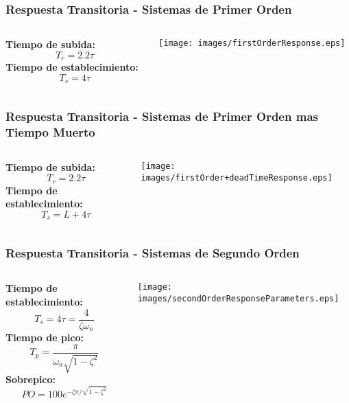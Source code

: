 \documentclass[aspectratio=169,handout]{beamer}
\theoremstyle{definition}
\theoremstyle{plain}
\theoremstyle{remark}
\begin{document}
\begin{frame}\frametitle{Respuesta Transitoria - Sistemas de Primer Orden}
\vspace*{3mm}
\begin{columns}
 \begin{column}{0.3\textwidth}
 \textbf{Tiempo de subida:}
 \begin{equation*}
   T_r = 2.2 \tau
 \end{equation*}
 \textbf{Tiempo de establecimiento:}
 \begin{equation*}
  T_s = 4 \tau
 \end{equation*}
 \end{column} 
 \begin{column}{0.7\textwidth}
  \centering
  \texttt{[image: images/firstOrderResponse.eps]}
 \end{column} 
\end{columns}
\end{frame}

\begin{frame}[<-+>]\frametitle{Respuesta Transitoria - Sistemas de Primer Orden mas Tiempo Muerto}
\vspace*{3mm}
\begin{columns}
 \begin{column}{0.3\textwidth}
 \textbf{Tiempo de subida:}
 \begin{equation*}
   T_r = 2.2 \tau
 \end{equation*}
 \textbf{Tiempo de establecimiento:}
 \begin{equation*}
  T_s = L + 4 \tau
 \end{equation*}
 \end{column} 
 \begin{column}{0.7\textwidth}
  \centering
  \texttt{[image: images/firstOrder+deadTimeResponse.eps]}
 \end{column} 
\end{columns}
\end{frame}

\begin{frame}\frametitle{Respuesta Transitoria - Sistemas de Segundo Orden}
\vspace*{3mm}
\begin{columns}
 \begin{column}{0.3\textwidth}
 \textbf{Tiempo de establecimiento:}
 \begin{equation*}
  T_s = 4 \tau = \frac{4}{\zeta \omega_n}
 \end{equation*}
 \textbf{Tiempo de pico:}
 \begin{equation*}
   T_p = \frac{\pi}{\omega_n \sqrt{1-\zeta^2}}
 \end{equation*}
 \textbf{Sobrepico:}
 \begin{equation*}
   PO = 100 e^{-\zeta \pi/\sqrt{1-\zeta^2}}
 \end{equation*}
 \end{column} 
 \begin{column}{0.7\textwidth}
  \centering
  \texttt{[image: images/secondOrderResponseParameters.eps]}
 \end{column} 
\end{columns}
\end{frame}
\end{document}
